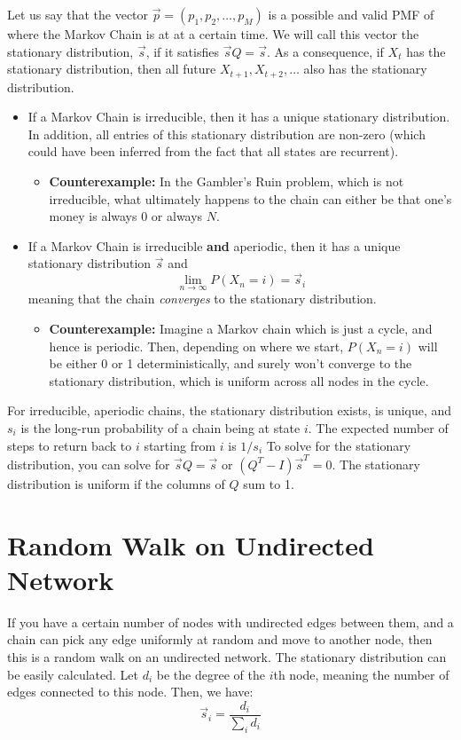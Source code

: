 \documentclass[11.5pt]{article}
\begin{document}
\begin{notes}
Let us say that the vector $\vec{p} = (p_1, p_2, \dots, p_M)$ is a possible and valid PMF of where the Markov Chain is at at a certain time. We will call this vector the stationary distribution, $\vec{s}$, if it satisfies $\vec{s}Q = \vec{s}$. As a consequence, if $X_t$ has the stationary distribution, then all future $X_{t+1}, X_{t + 2}, \dots$ also has the stationary distribution. 
\begin{itemize}
\item If a Markov Chain is irreducible, then it has a unique stationary distribution. In addition, all entries of this stationary distribution are non-zero (which could have been inferred from the fact that all states are recurrent).
\begin{itemize}
\item \textbf{Counterexample: } In the Gambler's Ruin problem, which is not irreducible, what ultimately happens to the chain can either be that one's money is always $0$ or always $N$. 
\end{itemize} 
\item If a Markov Chain is irreducible \textbf{and} aperiodic, then it has a unique stationary distribution $\vec{s}$ and $$ \lim_{n \to \infty} P(X_n = i) = \vec{s}_i$$
 meaning that the chain \textit{converges} to the stationary distribution. 
\begin{itemize}
\item \textbf{Counterexample: } Imagine a Markov chain which is just a cycle, and hence is periodic. Then, depending on where we start, $P(X_n = i)$ will be either 0 or 1 deterministically, and surely won't converge to the stationary distribution, which is uniform across all nodes in the cycle. 
\end{itemize}
\end{itemize}

For irreducible, aperiodic chains, the stationary distribution exists, is unique, and $s_i$ is the long-run probability of a chain being at state $i$. The expected number of steps to return back to $i$ starting from $i$ is $1/s_i$ To solve for the stationary distribution, you can solve for $\vec{s}Q = \vec{s}$ or $(Q^T - I)\vec{s}^T = 0$. The stationary distribution is uniform if the columns of $Q$ sum to 1.



\section*{Random Walk on Undirected Network}
If you have a certain number of nodes with undirected edges between them, and a chain can pick any edge uniformly at random and move to another node, then this is a random walk on an undirected network. The stationary distribution can be easily calculated. Let $d_i$ be the degree of the $i$th node, meaning the number of edges connected to this node. Then, we have: 
$$ \vec{s}_i = \frac{d_i}{\sum_i d_i}$$


\end{notes}
\end{document}
